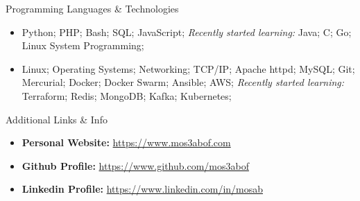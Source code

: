\documentclass[]{mosabcv}
\begin{document}
    \begin{cvsection}{Programming Languages \& Technologies}
        \begin{cvsubsection}{}{}{}
            \begin{itemize}
				\item Python; PHP; Bash; SQL; JavaScript; \textit{Recently started learning:} Java; C; Go; Linux System Programming;
				\item Linux; Operating Systems; Networking; TCP/IP; Apache httpd; MySQL; Git; Mercurial; Docker; Docker Swarm; Ansible; AWS; \textit{Recently started learning:} Terraform; Redis; MongoDB; Kafka; Kubernetes;
            \end{itemize}
        \end{cvsubsection}
    \end{cvsection}

    \begin{cvsection}{Additional Links \& Info}
        \begin{cvsubsection}{}{}{}
            \begin{itemize}
                \item \textbf{Personal Website:} \href{https://www.mos3abof.com}{https://www.mos3abof.com}
                \item \textbf{Github Profile:} \href{https://www.github.com/mos3abof}{https://www.github.com/mos3abof}
                \item \textbf{Linkedin Profile:} \href{https://www.linkedin.com/in/mosab}{https://www.linkedin.com/in/mosab}
            \end{itemize}
        \end{cvsubsection}
    \end{cvsection}
\end{document}
